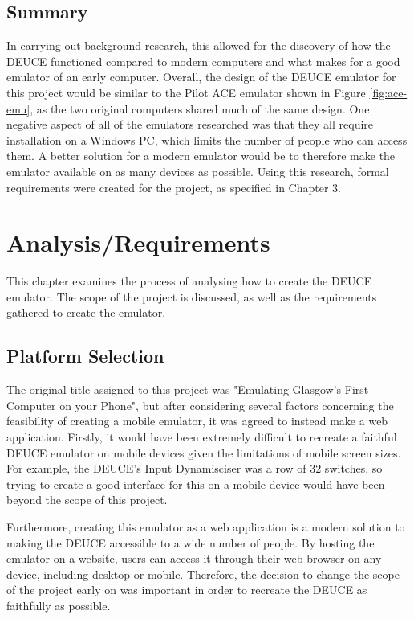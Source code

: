 \documentclass{l4proj}
\begin{document}
\section{Summary}
In carrying out background research, this allowed for the discovery of how the DEUCE functioned compared to modern computers and what makes for a good emulator of an early computer. Overall, the design of the DEUCE emulator for this project would be similar to the Pilot ACE emulator shown in Figure \ref{fig:ace-emu}, as the two original computers shared much of the same design. One negative aspect of all of the emulators researched was that they all require installation on a Windows PC, which limits the number of people who can access them. A better solution for a modern emulator would be to therefore make the emulator available on as many devices as possible. Using this research, formal requirements were created for the project, as specified in Chapter 3.

\chapter{Analysis/Requirements}
This chapter examines the process of analysing how to create the DEUCE emulator. The scope of the project is discussed, as well as the requirements gathered to create the emulator.

\section{Platform Selection}
The original title assigned to this project was "Emulating Glasgow's First Computer on your Phone", but after considering several factors concerning the feasibility of creating a mobile emulator, it was agreed to instead make a web application. Firstly, it would have been extremely difficult to recreate a faithful DEUCE emulator on mobile devices given the limitations of mobile screen sizes. For example, the DEUCE's Input Dynamisciser was a row of 32 switches, so trying to create a good interface for this on a mobile device would have been beyond the scope of this project.

Furthermore, creating this emulator as a web application is a modern solution to making the DEUCE accessible to a wide number of people. By hosting the emulator on a website, users can access it through their web browser on any device, including desktop or mobile. Therefore, the decision to change the scope of the project early on was important in order to recreate the DEUCE as faithfully as possible.
\end{document}
